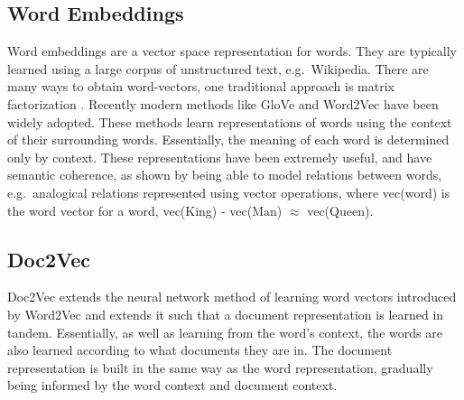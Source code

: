 




\subsection{Word Embeddings}\label{bg:WordVectors}


Word embeddings are a vector space representation for  words. They are typically learned using a large corpus of unstructured text, e.g.\ Wikipedia.  There are many ways to obtain word-vectors, one traditional approach is  matrix factorization \cite{Evy2007}. Recently modern methods like GloVe \cite{Pennington2014} and Word2Vec \cite{Mikolov2013} have been widely adopted. These methods learn representations of  words using the context of their surrounding words.  Essentially, the meaning of each word is determined only by  context. These representations have been extremely useful, and have semantic coherence, as shown by  being able to model relations between words, e.g.\  analogical relations represented using  vector operations, where vec(word) is the word vector for a word,   vec(King) - vec(Man) $\approx$ vec(Queen).             

\subsection{Doc2Vec}\label{ch2:doc2vec}

Doc2Vec \cite{Le2014a} extends the neural network method of learning word vectors introduced by Word2Vec \cite{Mikolov2013} and extends it such  that a document representation is learned in tandem. Essentially, as well as learning from the word's context, the words are also learned according to  what documents they are in. The document representation is built in the same way as the word representation, gradually being informed by the word context and document context.

